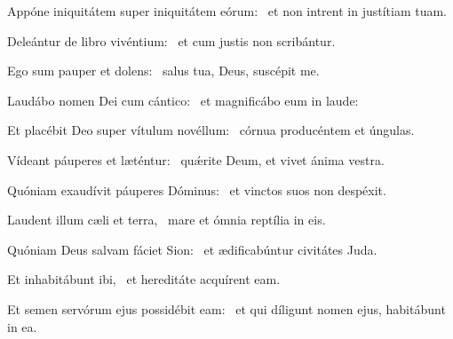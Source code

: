 \item Appóne iniquitátem super iniquitátem eórum:~\psstar{} et non intrent in justítiam tuam.

\item Deleántur de libro vivénti\-um:~\psstar{} et cum justis non scribántur.

\item Ego sum pauper et dolens:~\psstar{} salus tua, Deus, suscépit me.

\item Laudábo nomen Dei cum cántico:~\psstar{} et magnificábo eum in laude:

\item Et placébit Deo super vítulum novéllum:~\psstar{} córnua producéntem et úngulas.

\item Vídeant páuperes et lætén\-tur:~\psstar{} quǽrite Deum, et vivet ánima vestra.

\item Quóniam exaudívit páuperes Dóminus:~\psstar{} et vinctos suos non despéxit.

\item Laudent illum cæli et terra,~\psstar{} mare et ómnia reptília in eis.

\item Quóniam Deus salvam fáciet Sion:~\psstar{} et ædificabúntur civitátes Juda.

\item Et inhabitábunt ibi,~\psstar{} et hereditáte acquírent eam.

\item Et semen servórum ejus possidébit eam:~\psstar{} et qui díligunt nomen ejus, habitábunt in ea.

